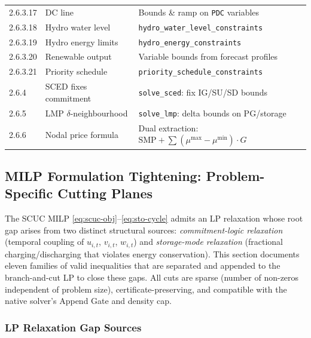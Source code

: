 \begin{longtable}{lll}
2.6.3.17     & DC line                      & Bounds \& ramp on \texttt{PDC} variables \\
2.6.3.18     & Hydro water level            & \texttt{hydro\_water\_level\_constraints} \\
2.6.3.19     & Hydro energy limits          & \texttt{hydro\_energy\_constraints} \\
2.6.3.20     & Renewable output             & Variable bounds from forecast profiles \\
2.6.3.21     & Priority schedule            & \texttt{priority\_schedule\_constraints} \\
\midrule
2.6.4        & SCED fixes commitment        & \texttt{solve\_sced}: fix IG/SU/SD bounds \\
2.6.5        & LMP $\delta$-neighbourhood   & \texttt{solve\_lmp}: delta bounds on PG/storage \\
2.6.6        & Nodal price formula          & Dual extraction: $\mathrm{SMP} + \sum (\mu^{\max}-\mu^{\min}) \cdot G$ \\
\bottomrule
\end{longtable}

\subsection{MILP Formulation Tightening: Problem-Specific Cutting Planes}
\label{sec:milp-tightening}

The SCUC MILP \eqref{eq:scuc-obj}--\eqref{eq:sto-cycle} admits an LP
relaxation whose root gap arises from two distinct structural sources:
\emph{commitment-logic relaxation} (temporal coupling of $u_{i,t}$,
$v_{i,t}$, $w_{i,t}$) and \emph{storage-mode relaxation} (fractional
charging/discharging that violates energy conservation).
This section documents eleven families of valid inequalities that are
separated and appended to the branch-and-cut LP to close these gaps.
All cuts are sparse (number of non-zeros independent of problem size),
certificate-preserving, and compatible with the native solver's Append
Gate and density cap.

\subsubsection{LP Relaxation Gap Sources}
\label{sec:lp-gap-sources}

